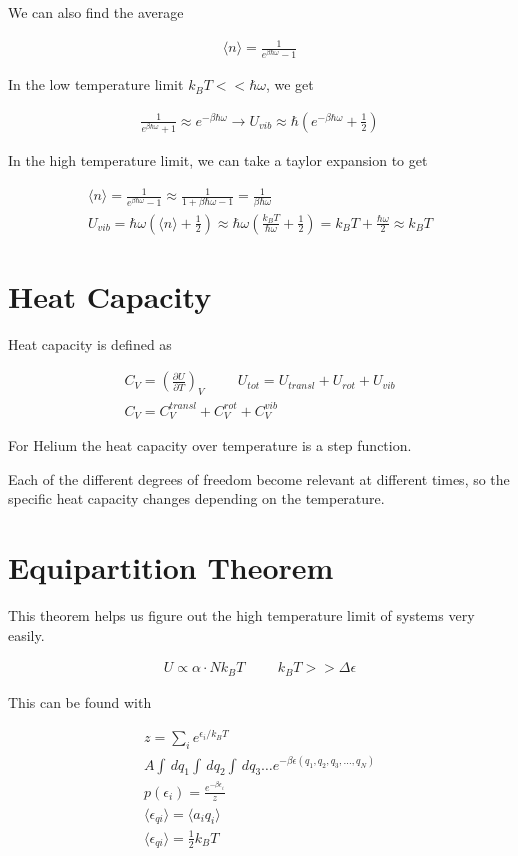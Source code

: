 \documentclass[fleqn]{report}
\newcommand{\hp}{\hspace{1cm}}
\newcommand{\del}{\partial}
\newcommand{\equations} [1] {
\begin{gather*}
#1
\end{gather*}
}
\begin{document}
We can also find the average 
\equations{
    \langle n \rangle 
    =
    \frac{1}{e^{\beta \hbar \omega} - 1}
}

In the low temperature limit $k_B T << \hbar \omega$, we get 
\equations{
    \frac{1}{e^{\beta \hbar \omega} + 1}
    \approx 
    e^{- \beta \hbar \omega}
    \rightarrow 
    U_{vib}
    \approx 
    \hbar
    \left(
        e^{-\beta \hbar \omega}
        +
        \frac{1}{2}
    \right)
}

In the high temperature limit, we can take a taylor expansion to get 
\equations{
    \langle n \rangle 
    =
    \frac{1}{e^{\beta \hbar \omega} - 1}
    \approx 
    \frac{1}{1 + \beta \hbar \omega - 1}
    =
    \frac{1}{\beta \hbar \omega}
    \\
    U_{vib}
    =
    \hbar \omega(\langle n \rangle + \frac{1}{2})
    \approx
    \hbar \omega
    \left(
        \frac{k_B T}{\hbar \omega} + \frac{1}{2}
    \right)
    =
    k_B T + \frac{\hbar \omega}{2}
    \approx 
    k_B T
}

\section{Heat Capacity}
Heat capacity is defined as 
\equations{
    C_V 
    =
    \left(
        \frac{\del U}{\del T}
    \right)_V
    \hp 
    U_{tot}
    =
    U_{transl}
    +
    U_{rot}
    +
    U_{vib}
    \\
    C_{V}
    =
    C_V^{transl}
    +
    C_V^{rot}
    +
    C_V^{vib}
}

For Helium the heat capacity over temperature is a step function. 

Each of the different degrees of freedom become relevant at different times, 
so the specific heat capacity changes depending on the temperature. 

\section{Equipartition Theorem}
This theorem helps us figure out the high temperature limit of systems 
very easily. 

\equations{
    U 
    \propto 
    \alpha 
    \cdot 
    N k_B T
    \hp 
    k_B T >> \Delta \epsilon
}

This can be found with 
\equations{
    z 
    =
    \sum_i 
    e^{\epsilon_i / k_B T}
    \\
    A 
    \int \, dq_1 
    \int \, dq_2
    \int \, dq_3 
    \ldots
    e^{-\beta \epsilon(q_1, q_2, q_3, \ldots, q_N)}
    \\
    p(\epsilon_i)
    =
    \frac{e^{- \beta \epsilon_i}}{z}
    \\
    \langle \epsilon_{qi} \rangle 
    =
    \langle a_i q_i \rangle 
    \\
    \langle \epsilon_{qi} \rangle 
    =
    \frac{1}{2} k_B T
}
\end{document}
